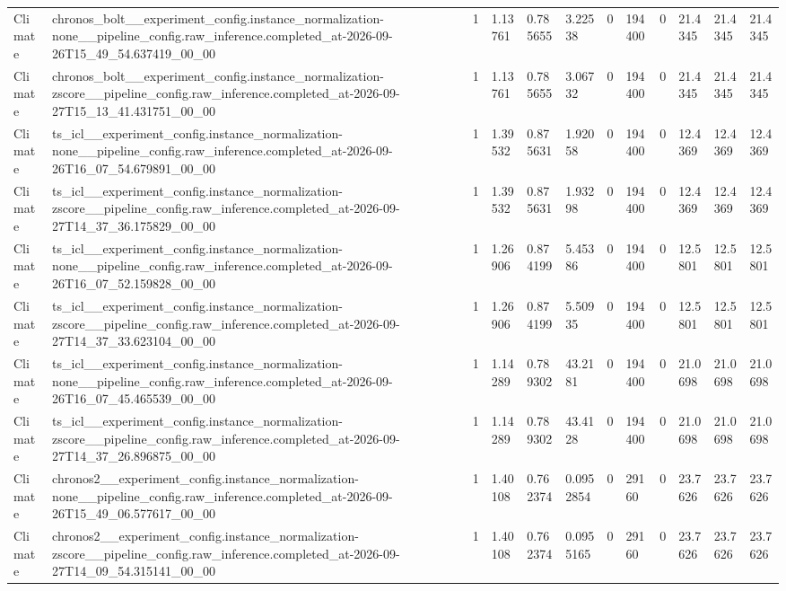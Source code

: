 \begin{tabular}{llllllllllll}
Climate & chronos\_bolt\_\_experiment\_config.instance\_normalization-none\_\_pipeline\_config.raw\_inference.completed\_at-2026-09-26T15\_49\_54.637419\_00\_00 & 1 & 1.13761 & 0.785655 & 3.22538 & 0 & 194400 & 0 & 21.4345 & 21.4345 & 21.4345 \\
Climate & chronos\_bolt\_\_experiment\_config.instance\_normalization-zscore\_\_pipeline\_config.raw\_inference.completed\_at-2026-09-27T15\_13\_41.431751\_00\_00 & 1 & 1.13761 & 0.785655 & 3.06732 & 0 & 194400 & 0 & 21.4345 & 21.4345 & 21.4345 \\
Climate & ts\_icl\_\_experiment\_config.instance\_normalization-none\_\_pipeline\_config.raw\_inference.completed\_at-2026-09-26T16\_07\_54.679891\_00\_00 & 1 & 1.39532 & 0.875631 & 1.92058 & 0 & 194400 & 0 & 12.4369 & 12.4369 & 12.4369 \\
Climate & ts\_icl\_\_experiment\_config.instance\_normalization-zscore\_\_pipeline\_config.raw\_inference.completed\_at-2026-09-27T14\_37\_36.175829\_00\_00 & 1 & 1.39532 & 0.875631 & 1.93298 & 0 & 194400 & 0 & 12.4369 & 12.4369 & 12.4369 \\
Climate & ts\_icl\_\_experiment\_config.instance\_normalization-none\_\_pipeline\_config.raw\_inference.completed\_at-2026-09-26T16\_07\_52.159828\_00\_00 & 1 & 1.26906 & 0.874199 & 5.45386 & 0 & 194400 & 0 & 12.5801 & 12.5801 & 12.5801 \\
Climate & ts\_icl\_\_experiment\_config.instance\_normalization-zscore\_\_pipeline\_config.raw\_inference.completed\_at-2026-09-27T14\_37\_33.623104\_00\_00 & 1 & 1.26906 & 0.874199 & 5.50935 & 0 & 194400 & 0 & 12.5801 & 12.5801 & 12.5801 \\
Climate & ts\_icl\_\_experiment\_config.instance\_normalization-none\_\_pipeline\_config.raw\_inference.completed\_at-2026-09-26T16\_07\_45.465539\_00\_00 & 1 & 1.14289 & 0.789302 & 43.2181 & 0 & 194400 & 0 & 21.0698 & 21.0698 & 21.0698 \\
Climate & ts\_icl\_\_experiment\_config.instance\_normalization-zscore\_\_pipeline\_config.raw\_inference.completed\_at-2026-09-27T14\_37\_26.896875\_00\_00 & 1 & 1.14289 & 0.789302 & 43.4128 & 0 & 194400 & 0 & 21.0698 & 21.0698 & 21.0698 \\
Climate & chronos2\_\_experiment\_config.instance\_normalization-none\_\_pipeline\_config.raw\_inference.completed\_at-2026-09-26T15\_49\_06.577617\_00\_00 & 1 & 1.40108 & 0.762374 & 0.0952854 & 0 & 29160 & 0 & 23.7626 & 23.7626 & 23.7626 \\
Climate & chronos2\_\_experiment\_config.instance\_normalization-zscore\_\_pipeline\_config.raw\_inference.completed\_at-2026-09-27T14\_09\_54.315141\_00\_00 & 1 & 1.40108 & 0.762374 & 0.0955165 & 0 & 29160 & 0 & 23.7626 & 23.7626 & 23.7626 \\

\end{tabular}

